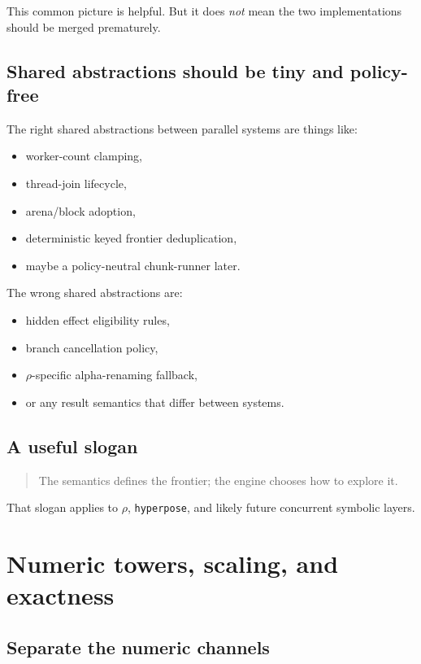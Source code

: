 \documentclass[11pt]{article}
\begin{document}
This common picture is helpful. But it does \emph{not} mean the two implementations should be merged prematurely.

\subsection{Shared abstractions should be tiny and policy-free}

The right shared abstractions between parallel systems are things like:
\begin{itemize}
    \item worker-count clamping,
    \item thread-join lifecycle,
    \item arena/block adoption,
    \item deterministic keyed frontier deduplication,
    \item maybe a policy-neutral chunk-runner later.
\end{itemize}

The wrong shared abstractions are:
\begin{itemize}
    \item hidden effect eligibility rules,
    \item branch cancellation policy,
    \item $\rho$-specific alpha-renaming fallback,
    \item or any result semantics that differ between systems.
\end{itemize}

\subsection{A useful slogan}

\begin{quote}
The semantics defines the frontier; the engine chooses how to explore it.
\end{quote}

That slogan applies to $\rho$, \texttt{hyperpose}, and likely future concurrent symbolic layers.

\section{Numeric towers, scaling, and exactness}

\subsection{Separate the numeric channels}
\end{document}
